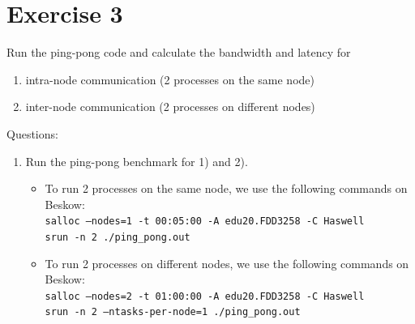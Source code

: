 \documentclass[12pt]{article}
\begin{document}
\section{Exercise 3}
Run the ping-pong code and calculate the bandwidth and latency for
\begin{enumerate}
    \item intra-node communication (2 processes on the same node)
    \item inter-node communication (2 processes on different nodes)
\end{enumerate}
Questions:
\begin{enumerate}
    \item Run the ping-pong benchmark for 1) and 2).
    \begin{itemize}
        \item To run 2 processes on the same node, we use the following commands on Beskow:\\
        \texttt{salloc --nodes=1 -t 00:05:00 -A edu20.FDD3258 -C Haswell}\\
        \texttt{srun -n 2 ./ping\_pong.out}


        \item To run 2 processes on different nodes, we use the following commands on Beskow:\\
        \texttt{salloc --nodes=2 -t 01:00:00 -A edu20.FDD3258 -C Haswell}\\
        \texttt{srun -n 2 --ntasks-per-node=1 ./ping\_pong.out}



\end{itemize}
\end{enumerate}
\end{document}
